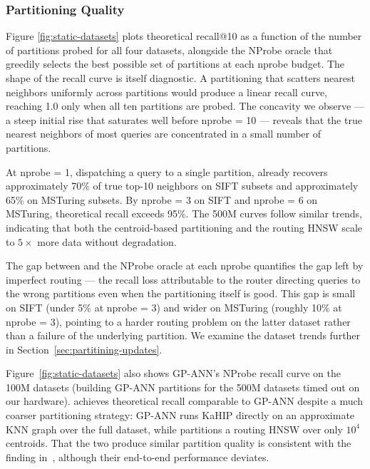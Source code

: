 \documentclass[sigconf,review,anonymous]{acmart}
\begin{document}
\subsubsection{Partitioning Quality}
\label{sec:partitioning-quality}
Figure \ref{fig:static-datasets} plots theoretical recall@10 as a function of the number of partitions probed for all four datasets, alongside the NProbe oracle that greedily selects the best possible set of partitions at each nprobe budget. The shape of the recall curve is itself diagnostic. A partitioning that scatters nearest neighbors uniformly across partitions would produce a linear recall curve, reaching 1.0 only when all ten partitions are probed. The concavity we observe — a steep initial rise that saturates well before nprobe = 10 — reveals that the true nearest neighbors of most queries are concentrated in a small number of partitions.

At nprobe = 1, dispatching a query to a single partition, \SystemName{} already recovers approximately 70\% of true top-10 neighbors on SIFT subsets and approximately 65\% on MSTuring subsets. By nprobe = 3 on SIFT and nprobe = 6 on MSTuring, theoretical recall exceeds 95\%. The 500M curves follow similar trends, indicating that both the centroid-based partitioning and the routing HNSW scale to $5\times$ more data without degradation. 

The gap between \SystemName{} and the NProbe oracle at each nprobe quantifies the gap left by imperfect routing — the recall loss attributable to the router directing queries to the wrong partitions even when the partitioning itself is good. This gap is small on SIFT (under 5\% at nprobe = 3) and wider on MSTuring (roughly 10\% at nprobe = 3), pointing to a harder routing problem on the latter dataset rather than a failure of the underlying partition. We examine the dataset trends further in Section~\ref{sec:partitining-updates}.

Figure~\ref{fig:static-datasets} also shows GP-ANN's NProbe recall curve on the 100M datasets (building GP-ANN partitions for the 500M datasets timed out on our hardware). \SystemName{} achieves theoretical recall comparable to GP-ANN despite a much coarser partitioning strategy: GP-ANN runs KaHIP directly on an approximate KNN graph over the full dataset, while \SystemName{} partitions a routing HNSW over only $10^4$ centroids. That the two produce similar partition quality is consistent with the finding in~\cite{gottesbueren2025unleashing}, although their end-to-end performance deviates. 
\end{document}
